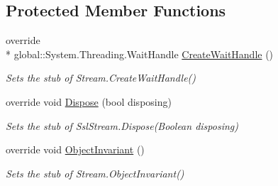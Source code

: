 \subsection*{Protected Member Functions}
\begin{DoxyCompactItemize}
\item 
override \\*
global\-::\-System.\-Threading.\-Wait\-Handle \hyperlink{class_system_1_1_net_1_1_security_1_1_fakes_1_1_stub_ssl_stream_aba7abf0060c1ae818537ff54692fd723}{Create\-Wait\-Handle} ()
\begin{DoxyCompactList}\small\item\em Sets the stub of Stream.\-Create\-Wait\-Handle()\end{DoxyCompactList}\item 
override void \hyperlink{class_system_1_1_net_1_1_security_1_1_fakes_1_1_stub_ssl_stream_adb44d135625cf5ec6a8eba5918cdcf7b}{Dispose} (bool disposing)
\begin{DoxyCompactList}\small\item\em Sets the stub of Ssl\-Stream.\-Dispose(\-Boolean disposing)\end{DoxyCompactList}\item 
override void \hyperlink{class_system_1_1_net_1_1_security_1_1_fakes_1_1_stub_ssl_stream_a7b1297ae1e35b99c155db6581dabca17}{Object\-Invariant} ()
\begin{DoxyCompactList}\small\item\em Sets the stub of Stream.\-Object\-Invariant()\end{DoxyCompactList}\end{DoxyCompactItemize}

